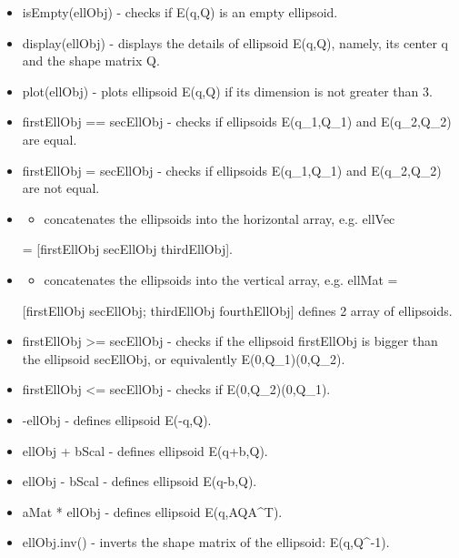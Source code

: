\documentclass[letterpaper,10pt,english]{sphinxmanual}
\begin{document}
\begin{itemize}
\item {} 
isEmpty(ellObj) - checks if {\mathcal E}(q,Q) is an empty
ellipsoid.

\item {} 
display(ellObj) - displays the details of ellipsoid
{\mathcal E}(q,Q), namely, its center q and the shape
matrix Q.

\item {} 
plot(ellObj) - plots ellipsoid {\mathcal E}(q,Q) if its
dimension is not greater than 3.

\item {} 
firstEllObj == secEllObj - checks if ellipsoids
{\mathcal E}(q_1,Q_1) and {\mathcal E}(q_2,Q_2) are
equal.

\item {} 
firstEllObj = secEllObj - checks if ellipsoids
{\mathcal E}(q_1,Q_1) and {\mathcal E}(q_2,Q_2) are
not equal.

\item {} \begin{itemize}
\item {} 
concatenates the ellipsoids into the horizontal array, e.g. ellVec

\end{itemize}

= {[}firstEllObj secEllObj thirdEllObj{]}.

\item {} \begin{itemize}
\item {} 
concatenates the ellipsoids into the vertical array, e.g. ellMat =

\end{itemize}

{[}firstEllObj secEllObj; thirdEllObj fourthEllObj{]} defines
2 array of ellipsoids.

\item {} 
firstEllObj \textgreater{}= secEllObj - checks if the ellipsoid firstEllObj is
bigger than the ellipsoid secEllObj, or equivalently
{\mathcal E}(0,Q_1)(0,Q_2).

\item {} 
firstEllObj \textless{}= secEllObj - checks if
{\mathcal E}(0,Q_2)(0,Q_1).

\item {} 
-ellObj - defines ellipsoid {\mathcal E}(-q,Q).

\item {} 
ellObj + bScal - defines ellipsoid {\mathcal E}(q+b,Q).

\item {} 
ellObj - bScal - defines ellipsoid {\mathcal E}(q-b,Q).

\item {} 
aMat * ellObj - defines ellipsoid {\mathcal E}(q,AQA^T).

\item {} 
ellObj.inv() - inverts the shape matrix of the ellipsoid:
{\mathcal E}(q,Q^{-1}).

\end{itemize}
\end{document}

